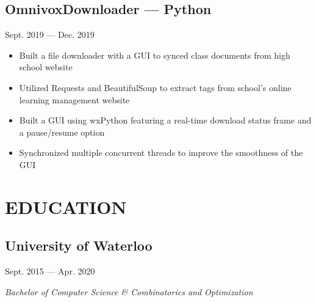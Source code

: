 \documentclass[11pt]{extarticle}
\begin{document}
\subsection*{OmnivoxDownloader --- Python} \hfill Sept. 2019 --- Dec. 2019
\begin{itemize}
  \item Built a file downloader with a GUI to synced class documents
    from high school website
  \item Utilized Requests and BeautifulSoup to
    extract tags from school's online learning management website
  \item Built a GUI using wxPython featuring
    a real-time download status frame and a pause/resume option
  \item Synchronized multiple concurrent threads to improve the smoothness
    of the GUI
\end{itemize}

\section*{EDUCATION}
\subsection*{University of Waterloo} \hfill {Sept. 2015 --- Apr. 2020}

\textit{Bachelor of Computer Science \& Combinatorics and Optimization }
\end{document}
